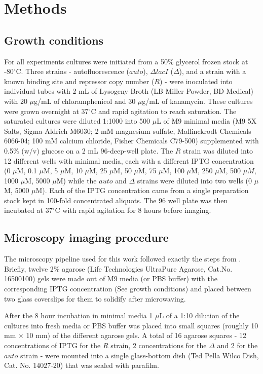 \section{Methods}

\subsection{Growth conditions}

For all experiments cultures were initiated from a 50\% glycerol frozen stock at
-80$^\circ$C. Three strains - autofluorescence ($auto$), $\Delta lacI$
($\Delta$), and a strain with a known binding site and repressor copy number
($R$) - were inoculated into individual tubes with 2 mL of Lysogeny Broth (LB
Miller Powder, BD Medical) with 20 $\mu$g/mL of chloramphenicol and 30 $\mu$g/mL
of kanamycin. These cultures were grown overnight at 37$^\circ$C and rapid
agitation to reach saturation. The saturated cultures were diluted 1:1000 into
500 $\mu$L of M9 minimal media (M9 5X Salts, Sigma-Aldrich M6030; 2 mM magnesium
sulfate, Mallinckrodt Chemicals 6066-04; 100 mM calcium chloride, Fisher
Chemicals C79-500) supplemented with 0.5\% (w/v) glucose on a 2 mL 96-deep-well
plate. The $R$ strain was diluted into 12 different wells with minimal media,
each with a different IPTG  concentration (0 $\mu$M, 0.1 $\mu$M, 5 $\mu$M, 10
$\mu$M, 25 $\mu$M, 50 $\mu$M, 75 $\mu$M, 100 $\mu$M, 250 $\mu$M, 500 $\mu M$,
1000 $\mu$M, 5000 $\mu$M) while  the $auto$ and $\Delta$ strains were diluted
into two wells (0 $\mu$M, 5000 $\mu$M). Each of the IPTG concentration came from
a single preparation stock kept in 100-fold concentrated aliquots. The 96 well
plate was then incubated at 37$^\circ$C with rapid agitation for 8 hours before
imaging.

\subsection{Microscopy imaging procedure}

The microscopy pipeline used for this work followed exactly the steps from
\cite{Razo-Mejia2018}. Briefly, twelve 2\% agarose (Life Technologies UltraPure
Agarose, Cat.No. 16500100) gels were made out of M9 media (or PBS buffer) with
the corresponding IPTG concentration (See growth conditions) and placed between
two glass coverslips for them to solidify after microwaving.

After the 8 hour incubation in minimal media 1 $\mu$L of a 1:10 dilution of the
cultures into fresh media or PBS buffer was placed into small squares (roughly
10 mm $\times$ 10 mm) of the different agarose gels. A total of 16 agarose
squares - 12 concentrations of IPTG for the $R$ strain, 2 concentrations for the
$\Delta$ and 2 for the $auto$ strain - were mounted into a single glass-bottom
dish (Ted Pella Wilco Dish, Cat. No. 14027-20) that was sealed with parafilm.

